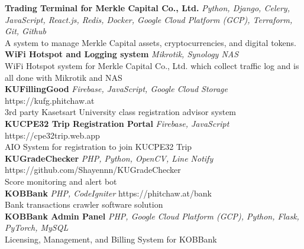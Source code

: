 {\textbf{Trading Terminal for Merkle Capital Co., Ltd.}} {\sl Python, Django, Celery, JavaScript, React.js, Redis, Docker, Google Cloud Platform (GCP), Terraform, Git, Github} \\
A system to manage Merkle Capital assets, cryptocurrencies, and digital tokens.\\
\vspace*{2mm}
{\textbf{WiFi Hotspot and Logging system}} {\sl Mikrotik, Synology NAS} \\
WiFi Hotspot system for Merkle Capital Co., Ltd. which collect traffic log and is all done with Mikrotik and NAS\\
\vspace*{2mm}
{\textbf{KUFillingGood}} {\sl Firebase, JavaScript, Google Cloud Storage} \hfill https://kufg.phitchaw.at\\
3rd party Kasetsart University class registration advisor system\\
\vspace*{2mm}
{\textbf{KUCPE32 Trip Registration Portal}} {\sl Firebase, JavaScript} \hfill https://cpe32trip.web.app\\
AIO System for registration to join KUCPE32 Trip\\
\vspace*{2mm}
{\textbf{KUGradeChecker}} {\sl PHP, Python, OpenCV, Line Notify} \hfill https://github.com/Shayennn/KUGradeChecker\\
Score monitoring and alert bot\\
\vspace*{2mm}
{\textbf{KOBBank}} {\sl PHP, CodeIgniter} \hfill https://phitchaw.at/bank\\
Bank transactions crawler software solution\\
\vspace*{2mm}
{\textbf{KOBBank Admin Panel}} {\sl PHP, Google Cloud Platform (GCP), Python, Flask, PyTorch, MySQL} \\
Licensing, Management, and Billing System for KOBBank\\
\vspace*{2mm}

